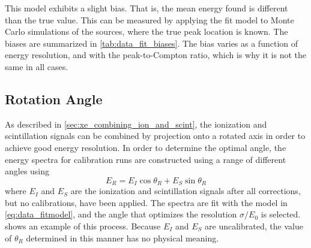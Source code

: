 \documentclass[herrin-thesis.tex]{subfiles}
\begin{document}
This model exhibits a slight bias. That is, the mean energy found is different than the true value. This can be measured by applying the fit model to Monte Carlo simulations of the sources, where the true peak location is known. The biases are summarized in \cref{tab:data_fit_biases}. The bias varies as a function of energy resolution, and with the peak-to-Compton ratio, which is why it is not the same in all cases.

\subsection{Rotation Angle}
As described in \cref{sec:xe_combining_ion_and_scint}, the ionization and scintillation signals can be combined by projection onto a rotated axis in order to achieve good energy resolution. In order to determine the optimal angle, the energy spectra for calibration runs are constructed using a range of different angles using
\begin{equation}
E_R = E_{I}\cos\theta_R + E_{S}\sin\theta_R
\label{eq:data_E_rotated}
\end{equation}
where \(E_I\) and \(E_S\) are the ionization and scintillation signals after all corrections, but no calibrations, have been applied. The spectra are fit with the model in \cref{eq:data_fitmodel}, and the angle that optimizes the resolution \(\sigma/E_0\) is selected.  shows an example of this process. Because \(E_I\) and \(E_S\) are uncalibrated, the value of \(\theta_R\) determined in this manner has no physical meaning.
\end{document}
